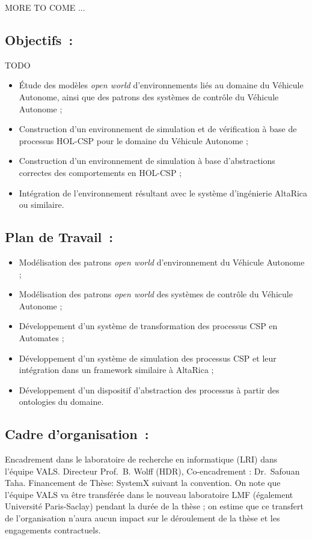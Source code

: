 \documentclass[a4paper,10pt]{article}
\begin{document}
MORE TO COME
... 

\subsection*{Objectifs~:}

TODO

\begin{itemize}
  \item
    Étude des modèles \emph{open world} d'environnements liés
    au domaine du Véhicule Autonome,
    ainsi que des patrons des systèmes de contrôle du Véhicule Autonome ;
\item
  Construction d'un environnement de simulation et de vérification
  à base de processus HOL-CSP pour le domaine du Véhicule Autonome ;
\item
  Construction d'un environnement de simulation
  à base d'abstractions correctes des comportements en HOL-CSP ;
\item
  Intégration de l'environnement résultant
  avec le système d'ingénierie AltaRica ou similaire.
\end{itemize}

\subsection*{Plan de Travail~:}
\begin{itemize}
  \item
    Modélisation des patrons \emph{open world}
    d'environnement du Véhicule Autonome ;
  \item
    Modélisation des patrons \emph{open world}
    des systèmes de contrôle du Véhicule Autonome ;
  \item
    Développement d'un système de transformation
    des processus CSP en Automates ;
  \item
    Développement d'un système de simulation des processus CSP
    et leur intégration dans un framework similaire à AltaRica ;
  \item
    Développement d'un dispositif d'abstraction des processus
    à partir des ontologies du domaine.
\end{itemize}

\subsection*{Cadre d'organisation~:}
Encadrement dans le laboratoire de recherche en informatique (LRI)
dans l'équipe VALS\@.
Directeur Prof.\ B. Wolff (HDR), Co-encadrement : Dr.\ Safouan Taha.
Financement de Thèse: SystemX suivant la convention.
On note que l'équipe VALS va être transférée
dans le nouveau laboratoire LMF (également Université Paris-Saclay)
pendant la durée de la thèse ;
on estime que ce transfert de l'organisation n'aura aucun impact
sur le déroulement de la thèse et les engagements contractuels.



\end{document}

